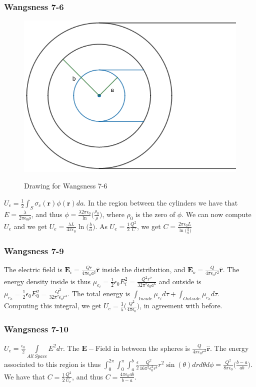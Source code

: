 \documentclass[oneside]{book}
\theoremstyle{mystyle}
\begin{document}
\subsubsection{Wangsness 7-6}
\begin{figure}[htbp]
    \centering
    {\includegraphics[scale=0.4]{7-6.png}}
    \caption{Drawing for Wangsness 7-6}
\end{figure}
$U_e = \frac{1}{2}\int_{S}\sigma_c(\mathbf{r})\phi(\mathbf{r})da$. In the region between the cylinders we have that $E = \frac{\lambda}{2\pi \epsilon_0 \rho}$, and thus $\phi= \frac{\lambda 2\pi \epsilon_0}\ln\big(\frac{\rho_0}{\rho}\big)$, where $\rho_0$ is the zero of $\phi$. We can now compute $U_e$ and we get $U_e = \frac{\lambda L}{4\pi \epsilon_0}\ln\big(\frac{b}{a}\big)$. As $U_e = \frac{1}{2}\frac{Q^2}{C}$, we get $C= \frac{2\pi \epsilon_0 L}{\ln\big(\frac{b}{a}\big)}$
\subsubsection{Wangsness 7-9}
The electric field is $\mathbf{E}_i = \frac{Qr}{4\pi \epsilon_0 a^3}\hat{\mathbf{r}}$ inside the distribution, and $\mathbf{E}_o = \frac{Q}{4\pi\epsilon_0r^2}\hat{\mathbf{r}}$. The energy density inside is thus $\mu_{e_i} = \frac{1}{2}\epsilon_0 E_i^2=\frac{Q^2r^2}{32\pi^2 \epsilon_0 a^6}$ and outside is $\mu_{e_o} = \frac{1}{2}\epsilon_0 E_0^2 = \frac{Q^2}{32\pi^2 \epsilon_0 r^4}$. The total energy is $\int_{Inside} \mu_{e_i}d\tau + \int_{Outside} \mu_{e_o}d\tau$. Computing this integral, we get $U_e = \frac{3}{5}\bigg( \frac{Q^2}{4\pi \epsilon_0}\bigg)$, in agreement with before.
\subsubsection{Wangsness 7-10}
$U_e = \frac{\epsilon_0}{2} \underset{All\ Space}\int E^2 d\tau$. The $\mathbf{E}-$Field in between the spheres is $\frac{Q}{4\pi \epsilon_0 r^2}\hat{\mathbf{r}}$. The energy associated to this region is thus $\int_{0}^{2\pi}\int_{0}^{\pi}\int_{a}^{b} \frac{\epsilon}{2} \frac{Q^2}{16\pi^2 \epsilon_0^2 r^4}r^2\sin(\theta) dr d\theta d\phi = \frac{Q^2}{8\pi \epsilon_0}\bigg(\frac{b-a}{ab}\bigg)$. We have that $C = \frac{1}{2} \frac{Q^2}{U_e}$, and thus $C = \frac{4\pi \epsilon_0 ab}{b-a}$.
\end{document}
